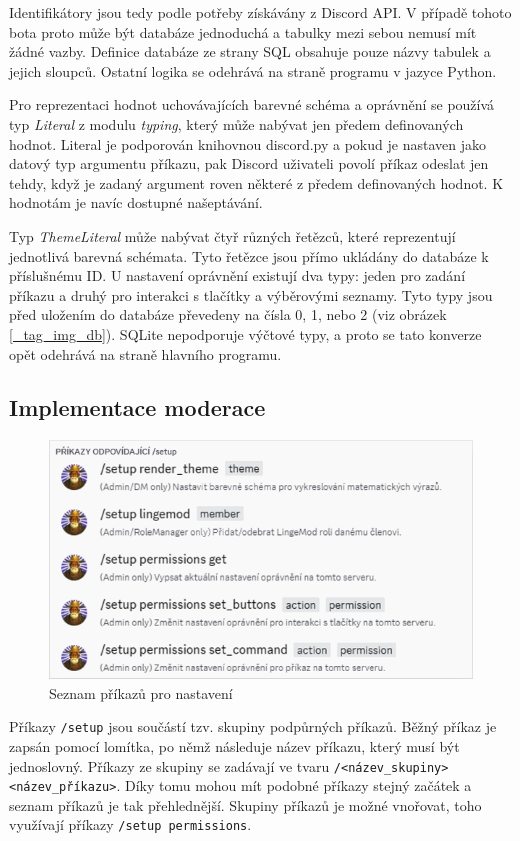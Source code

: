 \documentclass[FM]{tulthesis}
\begin{document}
	Identifikátory jsou tedy podle potřeby získávány z Discord API. V případě tohoto bota proto může být databáze jednoduchá a tabulky mezi sebou nemusí mít žádné vazby. Definice databáze ze strany SQL obsahuje pouze názvy tabulek a jejich sloupců. Ostatní logika se odehrává na straně programu v jazyce Python.
	
	Pro reprezentaci hodnot uchovávajících barevné schéma a oprávnění se používá typ \textit{Literal} z modulu \textit{typing}, který může nabývat jen předem definovaných hodnot. Literal je podporován knihovnou discord.py a pokud je nastaven jako datový typ argumentu příkazu, pak Discord uživateli povolí příkaz odeslat jen tehdy, když je zadaný argument roven některé z předem definovaných hodnot. K hodnotám je navíc dostupné našeptávání.
	
	Typ \textit{ThemeLiteral} může nabývat čtyř různých řetězců, které reprezentují jednotlivá barevná schémata. Tyto řetězce jsou přímo ukládány do databáze k příslušnému ID. U nastavení oprávnění existují dva typy: jeden pro zadání příkazu a druhý pro interakci s tlačítky a výběrovými seznamy. Tyto typy jsou před uložením do databáze převedeny na čísla 0, 1, nebo 2 (viz obrázek \ref{_tag_img_db}). SQLite nepodporuje výčtové typy, a proto se tato konverze opět odehrává na straně hlavního programu.
	
	\subsection{Implementace moderace}
	
	\begin{figure}[ht]
		\centering
		\includegraphics[width=\textwidth]{img/SetupCommands}
		\caption{Seznam příkazů pro nastavení}
	\end{figure}
	
	Příkazy \verb|/setup| jsou součástí tzv. skupiny podpůrných příkazů. Běžný příkaz je zapsán pomocí lomítka, po němž následuje název příkazu, který musí být jednoslovný. Příkazy ze skupiny se zadávají ve tvaru \verb|/<název_skupiny> <název_příkazu>|. Díky tomu mohou mít podobné příkazy stejný začátek a seznam příkazů je tak přehlednější. Skupiny příkazů je možné vnořovat, toho využívají příkazy \verb|/setup permissions|.
	
\end{document}
